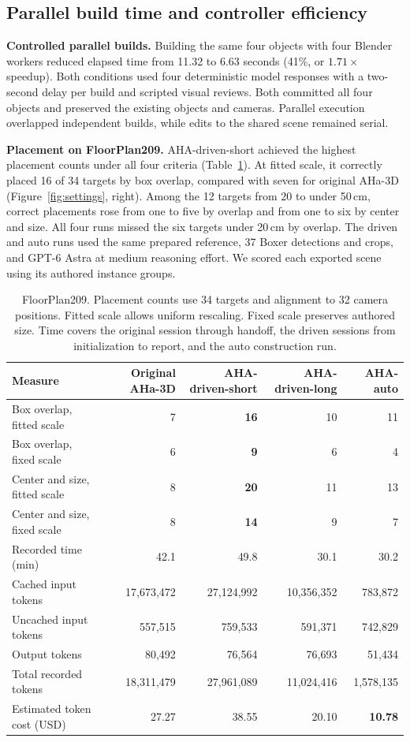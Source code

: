 \subsection{Parallel build time and controller efficiency}
\label{sec:parallel-time}
\textbf{Controlled parallel builds.} Building the same four objects with four
Blender workers reduced elapsed time from 11.32 to 6.63 seconds
(41\%, or $1.71\times$ speedup). Both conditions used four deterministic
model responses with a two-second delay per build and scripted visual reviews.
Both committed all four objects and preserved the existing objects and cameras.
Parallel execution overlapped independent builds, while edits to the shared
scene remained serial.

\textbf{Placement on FloorPlan209.} AHA-driven-short achieved the highest
placement counts under all four criteria (Table~\ref{tab:auto-floorplan209}).
At fitted scale, it correctly placed 16 of 34 targets by box overlap,
compared with seven for original AHa-3D (Figure~\ref{fig:settings}, right).
Among the 12 targets from 20 to under 50\,cm, correct placements rose from
one to five by overlap and from one to six by center and size. All four runs
missed the six targets under 20\,cm by overlap. The driven and auto runs
used the same prepared reference, 37 Boxer detections and crops, and GPT-6
Astra at medium reasoning effort. We scored each exported scene using its
authored instance groups.

\begin{table}[!htbp]
\centering\small
\caption{FloorPlan209. Placement counts use 34 targets and alignment to 32
camera positions. Fitted scale allows uniform rescaling. Fixed scale preserves
authored size. Time covers the original session through handoff, the driven
sessions from initialization to report, and the auto construction run.}
\label{tab:auto-floorplan209}
\setlength{\tabcolsep}{3pt}
\begin{tabular}{@{}lrrrr@{}}
\toprule
Measure & Original AHa-3D & AHA-driven-short & AHA-driven-long & AHA-auto \\
\midrule
Box overlap, fitted scale & 7 & \textbf{16} & 10 & 11 \\
Box overlap, fixed scale & 6 & \textbf{9} & 6 & 4 \\
Center and size, fitted scale & 8 & \textbf{20} & 11 & 13 \\
Center and size, fixed scale & 8 & \textbf{14} & 9 & 7 \\
\midrule
Recorded time (min) & 42.1 & 49.8 & 30.1 & 30.2 \\
Cached input tokens & 17,673,472 & 27,124,992 & 10,356,352 & 783,872 \\
Uncached input tokens & 557,515 & 759,533 & 591,371 & 742,829 \\
Output tokens & 80,492 & 76,564 & 76,693 & 51,434 \\
Total recorded tokens & 18,311,479 & 27,961,089 & 11,024,416 & 1,578,135 \\
Estimated token cost (USD) & 27.27 & 38.55 & 20.10 & \textbf{10.78} \\
\bottomrule
\end{tabular}
\end{table}

